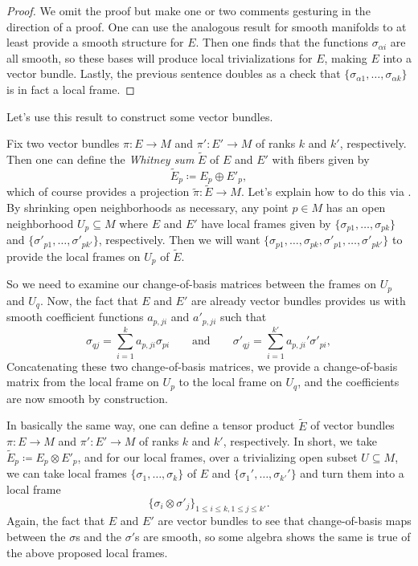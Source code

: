 \documentclass[../notes.tex]{subfiles}
\begin{document}
\begin{proof}
	We omit the proof but make one or two comments gesturing in the direction of a proof. One can use the analogous result for smooth manifolds to at least provide a smooth structure for $E$. Then one finds that the functions $\sigma_{\alpha i}$ are all smooth, so these bases will produce local trivializations for $E$, making $E$ into a vector bundle. Lastly, the previous sentence doubles as a check that $\{\sigma_{\alpha1},\ldots,\sigma_{\alpha k}\}$ is in fact a local frame.
\end{proof}
Let's use this result to construct some vector bundles.
\begin{example}
	Fix two vector bundles $\pi\colon E\to M$ and $\pi'\colon E'\to M$ of ranks $k$ and $k'$, respectively. Then one can define the \textit{Whitney sum} $\widetilde E$ of $E$ and $E'$ with fibers given by
	\[\widetilde E_p\coloneqq E_p\oplus E'_p,\]
	which of course provides a projection $\widetilde\pi\colon\widetilde E\to M$. Let's explain how to do this via . By shrinking open neighborhoods as necessary, any point $p\in M$ has an open neighborhood $U_p\subseteq M$ where $E$ and $E'$ have local frames given by $\{\sigma_{p1},\ldots,\sigma_{pk}\}$ and $\{\sigma'_{p1},\ldots,\sigma'_{pk'}\}$, respectively. Then we will want $\{\sigma_{p1},\ldots,\sigma_{pk},\sigma'_{p1},\ldots,\sigma'_{pk'}\}$ to provide the local frames on $U_p$ of $\widetilde E$.

	So we need to examine our change-of-basis matrices between the frames on $U_p$ and $U_q$. Now, the fact that $E$ and $E'$ are already vector bundles provides us with smooth coefficient functions $a_{p,ji}$ and $a'_{p,ji}$ such that
	\[\sigma_{qj}=\sum_{i=1}^ka_{p,ji}\sigma_{pi}\qquad\text{and}\qquad\sigma'_{qj}=\sum_{i=1}^{k'}a_{p,ji}'\sigma'_{pi},\]
	Concatenating these two change-of-basis matrices, we provide a change-of-basis matrix from the local frame on $U_p$ to the local frame on $U_q$, and the coefficients are now smooth by construction.
\end{example}
\begin{example}
	In basically the same way, one can define a tensor product $\widetilde E$ of vector bundles $\pi\colon E\to M$ and $\pi'\colon E'\to M$ of ranks $k$ and $k'$, respectively. In short, we take $\widetilde E_p\coloneqq E_p\otimes E'_p$, and for our local frames, over a trivializing open subset $U\subseteq M$, we can take local frames $\{\sigma_{1},\ldots,\sigma_{k}\}$ of $E$ and $\{\sigma_1',\ldots,\sigma_{k'}'\}$ and turn them into a local frame
	\[\{\sigma_i\otimes\sigma'_j\}_{1\le i\le k,1\le j\le k'}.\]
	Again, the fact that $E$ and $E'$ are vector bundles to see that change-of-basis maps between the $\sigma$s and the $\sigma'$s are smooth, so some algebra shows the same is true of the above proposed local frames.
\end{example}
\end{document}
